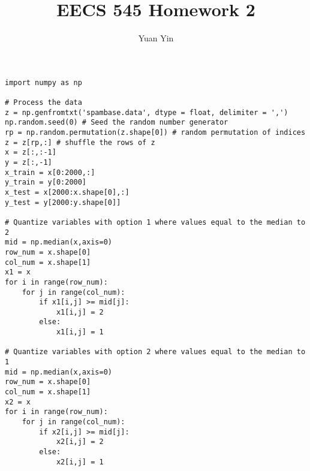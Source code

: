 \documentclass[letterpaper,11pt]{article}
\author{Yuan Yin}
\title{EECS 545 Homework 2}
\begin{document}
\large
\maketitle

\begin{lstlisting}
import numpy as np

# Process the data
z = np.genfromtxt('spambase.data', dtype = float, delimiter = ',')
np.random.seed(0) # Seed the random number generator
rp = np.random.permutation(z.shape[0]) # random permutation of indices
z = z[rp,:] # shuffle the rows of z
x = z[:,:-1]
y = z[:,-1]
x_train = x[0:2000,:]
y_train = y[0:2000]
x_test = x[2000:x.shape[0],:]
y_test = y[2000:y.shape[0]]

# Quantize variables with option 1 where values equal to the median to 2
mid = np.median(x,axis=0)
row_num = x.shape[0]
col_num = x.shape[1]
x1 = x
for i in range(row_num):
    for j in range(col_num):
        if x1[i,j] >= mid[j]:
            x1[i,j] = 2
        else:
            x1[i,j] = 1

# Quantize variables with option 2 where values equal to the median to 1
mid = np.median(x,axis=0)
row_num = x.shape[0]
col_num = x.shape[1]
x2 = x
for i in range(row_num):
    for j in range(col_num):
        if x2[i,j] >= mid[j]:
            x2[i,j] = 2
        else:
            x2[i,j] = 1
\end{lstlisting}
\end{document}
